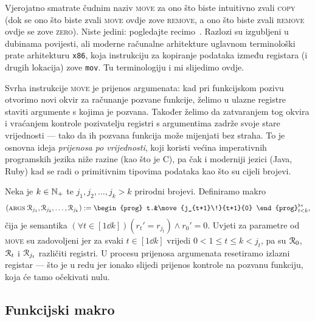 \begin{napomena}[{name=[{terminologija makroa za kopiranje, premještanje i brisanje}]}]
    Vjerojatno smatrate čudnim naziv \textsc{move} za ono što biste intuitivno zvali \textsc{copy} (dok se ono što biste zvali \textsc{move} ovdje zove \textsc{remove}, a ono što biste zvali \textsc{remove} ovdje se zove \textsc{zero}). Niste jedini: pogledajte recimo~\cite{url:movecopy}. Razlozi su izgubljeni u dubinama povijesti, ali moderne računalne arhitekture uglavnom terminološki prate arhitekturu \texttt{x86}, koja instrukciju za kopiranje podataka između registara (i drugih lokacija) zove \texttt{mov}. Tu terminologiju i mi slijedimo ovdje.
\end{napomena}

Svrha instrukcije \textsc{move} je prijenos argumenata: kad pri funkcijskom pozivu otvorimo novi okvir za računanje pozvane funkcije, želimo u ulazne registre staviti argumente s kojima je pozvana. Također želimo da zatvaranjem tog okvira i vraćanjem kontrole pozivatelju registri s argumentima zadrže svoje stare vrijednosti --- tako da ih pozvana funkcija može mijenjati bez straha. To je osnovna ideja \emph{prijenosa po vrijednosti}, koji koristi većina imperativnih programskih jezika niže razine (kao što je C), pa čak i moderniji jezici (Java, Ruby) kad se radi o primitivnim tipovima podataka kao što su cijeli brojevi.

Neka je $k\in{\mathbb N}_+$ te $j_1,j_2,\dotsc,j_k>k$ prirodni brojevi. %
 Definiramo makro
\begin{equation}
    (\textsc{args} \;\reg{j_1},\reg{j_2},\dotsc,\reg{j_k}):=\begin{prog} t.&\move{j_{t+1}\!}{t+1}{0}
    \end{prog}^{\flat*}_{t<k}\text,
\end{equation}
čija je semantika $(\forall t\in[1\dd k])(r_t'=r_{j_t})\land r_0'=0$. Uvjeti za parametre od \textsc{move} su zadovoljeni jer za svaki $t\in[1\dd k]$ vrijedi $0<1\le t\le k<j_t$, pa su $\mathcal R_{0}$, $\mathcal R_{t}$ i $\mathcal R_{j_t}$ različiti registri. U procesu prijenosa argumenata resetiramo izlazni registar --- što je u redu jer ionako slijedi prijenos kontrole na pozvanu funkciju, koja će tamo očekivati nulu.

\subsection{Funkcijski makro}

